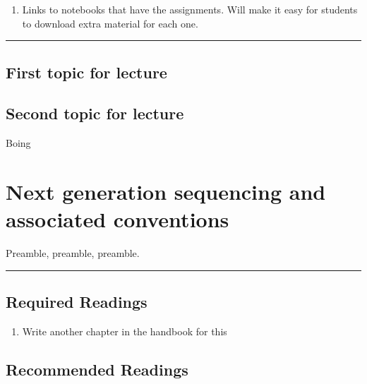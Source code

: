 \documentclass[]{book}
\providecommand{\tightlist}{%
  \setlength{\itemsep}{0pt}\setlength{\parskip}{0pt}}
\begin{document}
\begin{enumerate}
\def\labelenumi{\arabic{enumi}.}
\tightlist
\item
  Links to notebooks that have the assignments. Will make it
  easy for students to download extra material for each one.
\end{enumerate}

\begin{center}\rule{0.5\linewidth}{\linethickness}\end{center}

\hypertarget{first-topic-for-lecture-1}{%
\section{First topic for lecture}\label{first-topic-for-lecture-1}}

\hypertarget{second-topic-for-lecture-1}{%
\section{Second topic for lecture}\label{second-topic-for-lecture-1}}

Boing

\hypertarget{next-generation-sequencing-and-associated-conventions}{%
\chapter{Next generation sequencing and associated conventions}\label{next-generation-sequencing-and-associated-conventions}}

Preamble, preamble, preamble.

\begin{center}\rule{0.5\linewidth}{\linethickness}\end{center}

\hypertarget{required-readings-2}{%
\section*{Required Readings}\label{required-readings-2}}

\begin{enumerate}
\def\labelenumi{\arabic{enumi}.}
\tightlist
\item
  Write another chapter in the handbook for this
\end{enumerate}

\hypertarget{recommended-readings-2}{%
\section*{Recommended Readings}\label{recommended-readings-2}}
\end{document}
